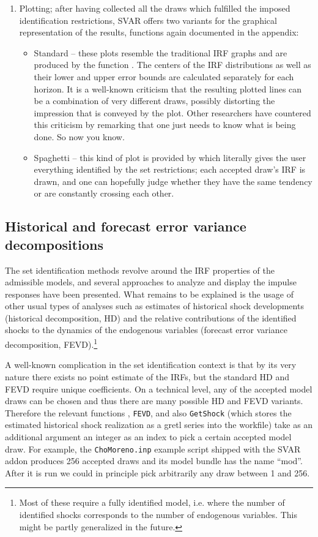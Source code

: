 \documentclass[a4paper,10pt]{article}
\newcommand{\dtk}[1]{\texttt{\detokenize{#1}}}
\newcounter{script}[section]
\begin{document}
\begin{enumerate}
\item Plotting; after having collected all the draws which fulfilled the imposed
  identification restrictions, SVAR offers two variants for the graphical
  representation of the results, functions again documented in the appendix:
  \begin{itemize}
  \item Standard -- these plots resemble the traditional IRF graphs and are produced 
    by the function \dtk{SVAR_SRirf}. The centers of the
    IRF distributions as well as their lower and upper error bounds are calculated 
    separately for each horizon. It is a well-known criticism that the resulting plotted
    lines can be a combination of very different draws, possibly distorting the impression 
    that is conveyed by the plot. Other researchers have countered this criticism by 
    remarking that one just needs to know what is being done. So now you know.
  \item Spaghetti -- this kind of plot is provided by \dtk{SVAR_spagplot} which 
  literally gives the user everything identified by the 
  set restrictions; each accepted draw's IRF is drawn, and one can hopefully judge 
  whether they have the same tendency or are constantly crossing each other.
 \end{itemize}

\end{enumerate}

\subsection{Historical and forecast error variance decompositions}

The set identification methods revolve around the IRF properties of the 
admissible models, and several approaches to analyze and display the 
impulse responses have been presented. What remains to be explained 
is the usage of other usual types of analyses such as estimates of historical
shock developments (historical decomposition, HD) and the relative contributions
of the identified shocks to the dynamics of the endogenous variables (forecast
error variance decomposition, FEVD).\footnote{Most of these require a fully
identified model, i.e. where the number of identified shocks corresponds to
the number of endogenous variables. This might be partly generalized in the
future.}

A well-known complication in the set identification context is that by its very 
nature there exists no point estimate of the IRFs, but the standard HD and FEVD 
require unique coefficients. On a technical level, any of the accepted model draws
can be chosen and thus there are many possible HD and FEVD variants. Therefore
the relevant functions \dtk{SVAR_hd}, \texttt{FEVD}, and also \texttt{GetShock}
(which stores the estimated historical shock realization as a gretl series into the
workfile) take as an additional argument an integer as an index to pick a certain
accepted model draw.
For example, the \texttt{ChoMoreno.inp} example script shipped with the SVAR 
addon produces 256 accepted draws and its model bundle has the name ``mod''.
After it is run we could in principle pick arbitrarily any draw between 1 and 256.
\end{document}
